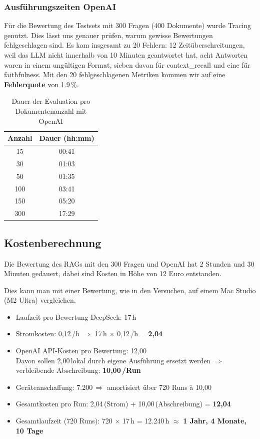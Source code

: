 \subsubsection{Ausführungszeiten OpenAI}
Für die Bewertung des Testsets mit 300 Fragen (400 Dokumente) wurde Tracing genutzt. Dies lässt uns genauer prüfen, warum gewisse Bewertungen fehlgeschlagen sind.
Es kam insgesamt zu 20 Fehlern: 12 Zeitüberschreitungen, weil das LLM nicht innerhalb von 10 Minuten geantwortet hat, acht Antworten waren in einem ungültigen Format, sieben davon für context\_recall und eine für faithfulness.
Mit den 20 fehlgeschlagenen Metriken kommen wir auf eine \textbf{Fehlerquote} von 1.9\,\%.

\begin{table}[h!]
    \centering
    \begin{tabular}{|c|c|}
    \hline
    \textbf{Anzahl} & \textbf{Dauer (hh:mm)} \\
    \hline
    15   & 00:41 \\
    30   & 01:03 \\
    50   & 01:35 \\
    100  & 03:41 \\
    150  & 05:20 \\
    300  & 17:29 \\
    \hline
    \end{tabular}
    \caption{Dauer der Evaluation pro Dokumentenanzahl mit OpenAI}
\end{table}

\subsection{Kostenberechnung}

Die Bewertung des RAGs mit den 300 Fragen und OpenAI hat 2 Stunden und 30 Minuten gedauert, dabei sind Kosten in Höhe von 12 Euro entstanden.

Dies kann man mit einer Bewertung, wie in den Versuchen, auf einem Mac Studio (M2 Ultra) vergleichen.
\begin{itemize}
    \item Laufzeit pro Bewertung DeepSeek: 17\,h
    \item Stromkosten: 0,12\,\texteuro/h $\Rightarrow$ 17\,h $\times$ 0,12\,\texteuro/h = \textbf{2,04\,\texteuro}
    \item OpenAI API-Kosten pro Bewertung: 12,00\,\texteuro\\
          Davon sollen 2,00\,\texteuro lokal durch eigene Ausführung ersetzt werden $\Rightarrow$ verbleibende Abschreibung: \textbf{10,00\,\texteuro/Run}
    \item Geräteanschaffung: 7.200\,\texteuro $\Rightarrow$ amortisiert über 720 Runs à 10,00\,\texteuro
    \item Gesamtkosten pro Run: 2,04\,\texteuro (Strom) + 10,00\,\texteuro (Abschreibung) = \textbf{12,04\,\texteuro}
    \item Gesamtlaufzeit (720 Runs): 720 $\times$ 17\,h = 12.240\,h $\approx$ \textbf{1 Jahr, 4 Monate, 10 Tage}
\end{itemize}


